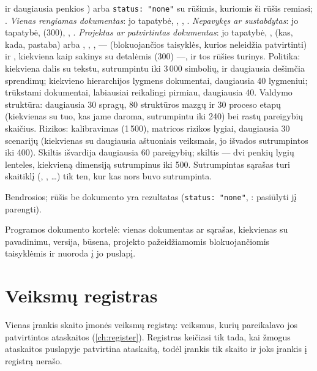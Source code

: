 \begin{description}[style=multiline, leftmargin=19mm, labelwidth=17mm, labelsep=2mm,
  font=\sffamily\bfseries\footnotesize\color{ink}, itemsep=1pt, topsep=2pt, before=\raggedright]
    ir daugiausia penkios ) arba \texttt{status: "none"} su rūšimis, kuriomis ši
    rūšis remiasi; . \emph{Vienas rengiamas dokumentas}: jo tapatybė,
    , , . \emph{Nepavykęs ar sustabdytas}: jo tapatybė,
     (300), , . \emph{Projektas ar patvirtintas dokumentas}:
    jo tapatybė, ,  (kas, kada, pastaba) arba ,
    , ,  ---  (blokuojančios taisyklės, kurios
    neleidžia patvirtinti) ir , kiekviena kaip sakinys su detalėmis (300) ---,
     ir tos rūšies turinys. Politika: kiekviena dalis su tekstu, sutrumpintu iki
    3\,000 simbolių, ir daugiausia dešimčia sprendimų; kiekvieno hierarchijos lygmens
    dokumentai, daugiausia 40 lygmeniui; trūkstami dokumentai, labiausiai reikalingi pirmiau,
    daugiausia 40. Valdymo struktūra: daugiausia 30 spragų, 80 struktūros mazgų ir 30 proceso
    etapų (kiekvienas su tuo, kas jame daroma, sutrumpintu iki 240) bei rastų pareigybių
    skaičius. Rizikos: kalibravimas (1\,500), matricos rizikos lygiai, daugiausia 30 scenarijų
    (kiekvienas su daugiausia aštuoniais veiksmais, jo išvados sutrumpintos iki 400). Skiltis
     išvardija daugiausia 60 pareigybių; skiltis  --- dvi
    penkių lygių lenteles, kiekvieną dimensiją sutrumpinus iki 500. Sutrumpintas sąrašas turi
    skaitiklį (, , …) tik ten, kur kas nors buvo
    sutrumpinta.
  \item[Klaidos] Bendrosios; rūšis be dokumento yra rezultatas (\texttt{status: "none"},
    : pasiūlyti jį parengti).
  \item[Konsolė] Programos dokumento kortelė: vienas dokumentas ar sąrašas, kiekvienas su
    pavadinimu, versija, būsena, projekto pažeidžiamomis blokuojančiomis taisyklėmis ir
    nuoroda į jo puslapį.
\end{description}


\section{Veiksmų registras}\label{sec:tools:register}

Vienas įrankis skaito įmonės veiksmų registrą: veiksmus, kurių pareikalavo jos patvirtintos
ataskaitos (\cref{ch:register}). Registras keičiasi tik tada, kai žmogus ataskaitos puslapyje
patvirtina ataskaitą, todėl įrankis tik skaito ir joks įrankis į registrą nerašo.

